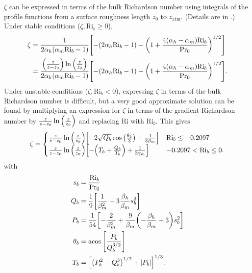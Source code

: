 \documentclass[10pt]{article}
\begin{document}
$\zeta$ can be expressed in terms of the bulk Richardson number using integrals of the profile functions from a surface roughness length $z_0$ to $z_{\mathrm{atm}}$. (Details are in \citet{Byun1990}.) Under stable conditions ($\zeta, \mathrm{Ri}_b \ge 0$),
\begin{align} 
\zeta &= \frac{1}{2 \alpha_h (\alpha_m \mathrm{Ri}_b - 1)} \qty[ -(2 \alpha_h \mathrm{Ri}_b - 1) - \qty(1 + \frac{4(\alpha_h - \alpha_m) \mathrm{Ri}_b}{\mathrm{Pr}_0})^{1/2} ] \\
&= \label{eqn:zeta1} \frac{\qty(\frac{z}{z - z_0}) \ln \qty(\frac{z}{z_0})}{2 \alpha_h (\alpha_m \mathrm{Ri}_b - 1)} \qty[ -(2 \alpha_h \mathrm{Ri}_b - 1) - \qty(1 + \frac{4(\alpha_h - \alpha_m) \mathrm{Ri}_b}{\mathrm{Pr}_0})^{1/2} ].
\end{align}
Under unstable conditions ($\zeta, \mathrm{Ri}_b < 0$), expressing $\zeta$ in terms of the bulk Richardson number is difficult, but a very good approximate solution can be found by multiplying an expression for $\zeta$ in terms of the gradient Richardson number by $\frac{z}{z - z_0} \ln \qty(\frac{z}{z_0})$ and replacing $\mathrm{Ri}$ with $\mathrm{Ri}_b$. This gives
\begin{equation} \label{eqn:zeta2}
\zeta = 
\begin{cases}
\frac{z}{z - z_0} \ln \qty(\frac{z}{z_0}) \qty [ -2 \sqrt{Q_b} \cos \qty(\frac{\theta_b}{3}) + \frac{1}{3 \beta_m}] & \mathrm{Ri}_b \le -0.2097 \\
\frac{z}{z - z_0} \ln \qty(\frac{z}{z_0}) \qty [-\qty(T_b + \frac{Q_b}{T_b}) + \frac{1}{3 \gamma_m}] & -0.2097 < \mathrm{Ri}_b \le 0.
\end{cases}
\end{equation}
with
\begin{align*}
s_b &= \frac{\mathrm{Ri}_b}{\mathrm{Pr}_0} \\
Q_b &= \frac{1}{9} \qty [\frac{1}{\beta_m^2} + 3 \frac{\beta_h}{\beta_m} s_b^2] \\
P_b &= \frac{1}{54} \qty [-\frac{2}{\beta_m^3} + \frac{9}{\beta_m} \qty(-\frac{\beta_h}{\beta_m} + 3) s_b^2] \\
\theta_b &= \acos \qty [\frac{P_b}{Q_b^{3/2}}] \\
T_b &= \qty [ \qty(P_b^2 - Q_b^3)^{1/2} + |P_b|]^{1/3}.
\end{align*}
\end{document}
